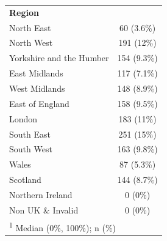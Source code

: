 \documentclass[]{cupjournal}
\begin{document}
\begin{longtable}[t]{lc}
\textbf{Region} & \\
\hspace{1em}North East & 60 (3.6\%)\\
\hspace{1em}North West & 191 (12\%)\\
\hspace{1em}Yorkshire and the Humber & 154 (9.3\%)\\
\hspace{1em}East Midlands & 117 (7.1\%)\\
\hspace{1em}West Midlands & 148 (8.9\%)\\
\hspace{1em}East of England & 158 (9.5\%)\\
\hspace{1em}London & 183 (11\%)\\
\hspace{1em}South East & 251 (15\%)\\
\hspace{1em}South West & 163 (9.8\%)\\
\hspace{1em}Wales & 87 (5.3\%)\\
\hspace{1em}Scotland & 144 (8.7\%)\\
\hspace{1em}Northern Ireland & 0 (0\%)\\
\hspace{1em}Non UK \& Invalid & 0 (0\%)\\
\bottomrule
\multicolumn{2}{l}{\rule{0pt}{1em}\textsuperscript{1} Median (0\%, 100\%); n (\%)}\\
\end{longtable}
\end{document}
